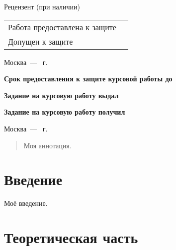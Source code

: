 \documentclass{mirea}
\begin{document}
\begin{titlepage}
		Рецензент (при наличии)  \hfill{} \bigskip\par
		\begin{tabular}{@{}ll}
			Работа предоставлена к защите & \blankDate{}{} \bigskip\\
			Допущен к защите & \blankDate{}{}
		\end{tabular}
		\begin{center}
			\vfill Москва~--- \the\year{}~г.
		\end{center}
		\newpage
		\textbf{Срок предоставления к защите курсовой работы до} \hfill\blankDate{}{} \par
		\textbf{Задание на курсовую работу выдал}  \hfill{} \par
		\hfill\blankDate{}{} \par
		\textbf{Задание на курсовую работу получил}  \hfill{} \par\bigskip
		\begin{center}
			Москва~--- \the\year{}~г.
		\end{center}
	\end{titlepage}
	\addtocounter{page}{2}
	
	
	
	\begin{abstract}
		Моя аннотация.
	\end{abstract}
	
	
	
	\tableofcontents
	
	
	
	\section*{Введение}
	
	Моё введение.
	
	
	
	\section{Теоретическая часть}
	
\end{document}
